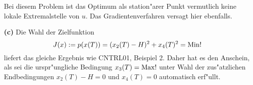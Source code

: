 \documentclass[12pt,a4paper,twoside,leqno]{article}
\begin{document}
Bei diesem Problem ist das Optimum als station"arer Punkt vermutlich keine
lokale Extremalstelle von $u$. Das Gradientenverfahren versagt hier ebenfalls.
\par
\vspace{1mm}
{\bf (c)} Die Wahl der Zielfunktion
\[
J(x) := p(x(T))= (x_2(T) - H)^2 + x_4(T)^2 = \mathop{\rm Min}\nolimits !
\]
liefert das gleiche Ergebnis wie CNTRL01, Beispiel 2. Daher hat es den
Anschein, als sei die urspr"ungliche Bedingung $x_3(T) = \mathop{\rm Max}\nolimits!$ unter Wahl der
zus"atzlichen Endbedingungen $x_2(T) - H = 0$ und $x_4(T) = 0$
automatisch erf"ullt.



\end{document}

